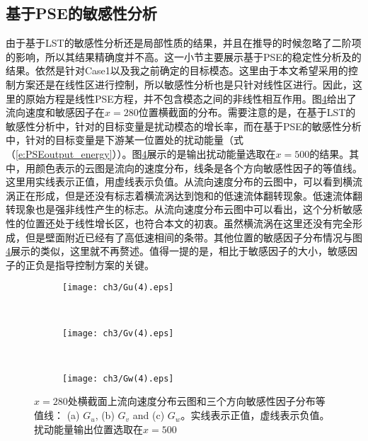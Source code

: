 \subsection{基于PSE的敏感性分析}
由于基于LST的敏感性分析还是局部性质的结果，并且在推导的时候忽略了二阶项的影响，所以其结果精确度并不高。这一小节主要展示基于PSE的稳定性分析及的结果。依然是针对Case1以及我之前确定的目标模态。这里由于本文希望采用的控制方案还是在线性区进行控制，所以敏感性分析也是只针对线性区进行。因此，这里的原始方程是线性PSE方程，并不包含模态之间的非线性相互作用。图\ref{f:Guvw1}给出了流向速度和敏感因子在$x =280$位置横截面的分布。需要注意的是，在基于LST的敏感性分析中，针对的目标变量是扰动模态的增长率，而在基于PSE的敏感性分析中，针对的目标变量是下游某一位置处的扰动能量（式（\ref{e:PSEoutput_energy}））。图\ref{f:Guvw1}展示的是输出扰动能量选取在$x =500$的结果。其中，用颜色表示的云图是流向的速度分布，线条是各个方向敏感性因子的等值线。这里用实线表示正值，用虚线表示负值。从流向速度分布的云图中，可以看到横流涡正在形成，但是还没有标志着横流涡达到饱和的低速流体翻转现象。低速流体翻转现象也是强非线性产生的标志。从流向速度分布云图中可以看出，这个分析敏感性的位置还处于线性增长区，也符合本文的初衷。虽然横流涡在这里还没有完全形成，但是壁面附近已经有了高低速相间的条带。其他位置的敏感因子分布情况与图\ref{f:Guvw1}展示的类似，这里就不再赘述。值得一提的是，相比于敏感因子的大小，敏感因子的正负是指导控制方案的关键。
\begin{figure}[H]
  \centering
  \begin{subfigure}{0.8\textwidth}
  \texttt{[image: ch3/Gu(4).eps]}
  \caption{\label{f:Gu1}}
  \end{subfigure}\\
  \bigskip
  \begin{subfigure}{0.8\textwidth}
  \texttt{[image: ch3/Gv(4).eps]}
  \caption{\label{f:Gv1}}
  \end{subfigure}\\
  \bigskip
  \begin{subfigure}{0.8\textwidth}
  \texttt{[image: ch3/Gw(4).eps]}
  \caption{\label{f:Gw1}}
  \end{subfigure}
  \caption{$x =280$处横截面上流向速度分布云图和三个方向敏感性因子分布等值线： (a) $G_u$, (b) $G_v$ and (c) $G_w$。实线表示正值，虚线表示负值。扰动能量输出位置选取在$x =500$}\label{f:Guvw1}
\end{figure}
